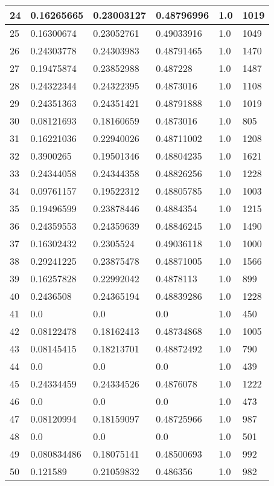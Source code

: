 \begin{longtable}{|l|l|l|l|l|l|}
24 & 0.16265665 & 0.23003127 & 0.48796996 & 1.0 & 1019 \\ \hline 
25 & 0.16300674 & 0.23052761 & 0.49033916 & 1.0 & 1049 \\ \hline 
26 & 0.24303778 & 0.24303983 & 0.48791465 & 1.0 & 1470 \\ \hline 
27 & 0.19475874 & 0.23852988 & 0.487228 & 1.0 & 1487 \\ \hline 
28 & 0.24322344 & 0.24322395 & 0.4873016 & 1.0 & 1108 \\ \hline 
29 & 0.24351363 & 0.24351421 & 0.48791888 & 1.0 & 1019 \\ \hline 
30 & 0.08121693 & 0.18160659 & 0.4873016 & 1.0 & 805 \\ \hline 
31 & 0.16221036 & 0.22940026 & 0.48711002 & 1.0 & 1208 \\ \hline 
32 & 0.3900265 & 0.19501346 & 0.48804235 & 1.0 & 1621 \\ \hline 
33 & 0.24344058 & 0.24344358 & 0.48826256 & 1.0 & 1228 \\ \hline 
34 & 0.09761157 & 0.19522312 & 0.48805785 & 1.0 & 1003 \\ \hline 
35 & 0.19496599 & 0.23878446 & 0.4884354 & 1.0 & 1215 \\ \hline 
36 & 0.24359553 & 0.24359639 & 0.48846245 & 1.0 & 1490 \\ \hline 
37 & 0.16302432 & 0.2305524 & 0.49036118 & 1.0 & 1000 \\ \hline 
38 & 0.29241225 & 0.23875478 & 0.48871005 & 1.0 & 1566 \\ \hline 
39 & 0.16257828 & 0.22992042 & 0.4878113 & 1.0 & 899 \\ \hline 
40 & 0.2436508 & 0.24365194 & 0.48839286 & 1.0 & 1228 \\ \hline 
41 & 0.0 & 0.0 & 0.0 & 1.0 & 450 \\ \hline 
42 & 0.08122478 & 0.18162413 & 0.48734868 & 1.0 & 1005 \\ \hline 
43 & 0.08145415 & 0.18213701 & 0.48872492 & 1.0 & 790 \\ \hline 
44 & 0.0 & 0.0 & 0.0 & 1.0 & 439 \\ \hline 
45 & 0.24334459 & 0.24334526 & 0.4876078 & 1.0 & 1222 \\ \hline 
46 & 0.0 & 0.0 & 0.0 & 1.0 & 473 \\ \hline 
47 & 0.08120994 & 0.18159097 & 0.48725966 & 1.0 & 987 \\ \hline 
48 & 0.0 & 0.0 & 0.0 & 1.0 & 501 \\ \hline 
49 & 0.080834486 & 0.18075141 & 0.48500693 & 1.0 & 992 \\ \hline 
50 & 0.121589 & 0.21059832 & 0.486356 & 1.0 & 982 \\ \hline 
\end{longtable}